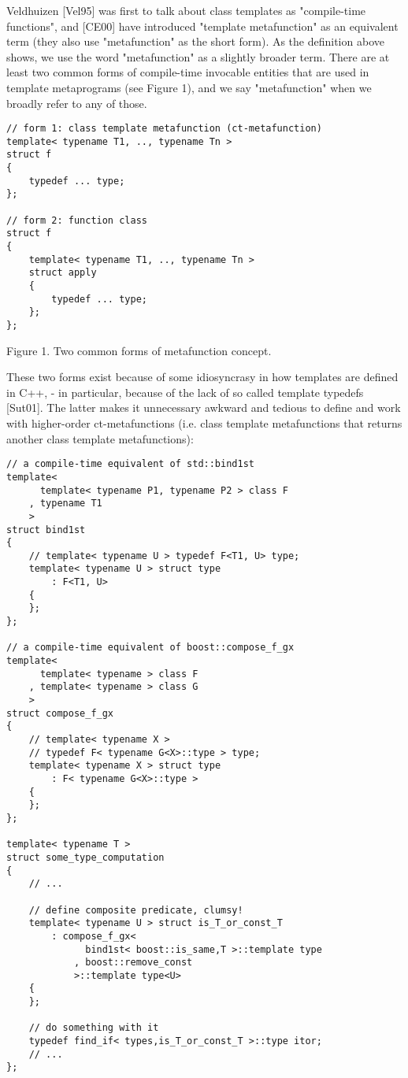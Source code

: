 \documentclass{netobjectdays}
\begin{document}
Veldhuizen [Vel95] was first to talk about class templates 
as "compile-time functions", and [CE00] have introduced 
"template metafunction" as an equivalent term (they also 
use "metafunction" as the short form). As the definition 
above shows, we use the word "metafunction" as a slightly 
broader term. There are at least two common forms of 
compile-time invocable entities that are used in template 
metaprograms (see Figure 1), and we say "metafunction" when 
we broadly refer to any of those.


{\footnotesize
\begin{verbatim}
// form 1: class template metafunction (ct-metafunction)
template< typename T1, .., typename Tn >
struct f
{
    typedef ... type;
};

// form 2: function class
struct f
{
    template< typename T1, .., typename Tn >
    struct apply
    {
        typedef ... type;
    };
};
\end{verbatim}
}

Figure 1. Two common forms of metafunction concept.


These two forms exist because of some idiosyncrasy in 
how templates are defined in C++, - in particular, because 
of the lack of so called template typedefs [Sut01]. The 
latter makes it unnecessary awkward and tedious to define 
and work with higher-order ct-metafunctions (i.e. class 
template metafunctions that returns another class template 
metafunctions):


{\footnotesize
\begin{verbatim}
// a compile-time equivalent of std::bind1st
template<
      template< typename P1, typename P2 > class F
    , typename T1
    >
struct bind1st
{
    // template< typename U > typedef F<T1, U> type;
    template< typename U > struct type
        : F<T1, U>
    {
    };
};

// a compile-time equivalent of boost::compose_f_gx
template<
      template< typename > class F
    , template< typename > class G
    >
struct compose_f_gx
{
    // template< typename X > 
    // typedef F< typename G<X>::type > type;
    template< typename X > struct type
        : F< typename G<X>::type >
    {
    };
};

template< typename T >
struct some_type_computation
{
    // ...

    // define composite predicate, clumsy!
    template< typename U > struct is_T_or_const_T
        : compose_f_gx<
              bind1st< boost::is_same,T >::template type
            , boost::remove_const
            >::template type<U>
    {
    };

    // do something with it
    typedef find_if< types,is_T_or_const_T >::type itor;
    // ...
};
\end{verbatim}
}
\end{document}
